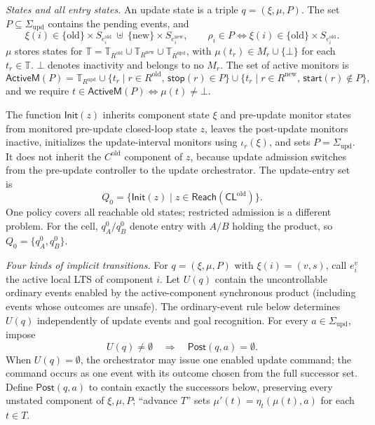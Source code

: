 \documentclass[acmsmall,screen,review,anonymous]{acmart}
\newcommand{\Post}{\mathsf{Post}}
\newcommand{\ActT}{\mathsf{ActiveM}}
\newcommand{\Init}{\mathsf{Init}}
\newcommand{\Reach}{\mathsf{Reach}}
\newcommand{\SigmaU}{\Sigma_{\mathrm{upd}}}
\newcommand{\ustart}[1]{\mathsf{start}(#1)}
\newcommand{\ustop}[1]{\mathsf{stop}(#1)}
\begin{document}
\begin{definition}
\label{def:configuration}
\label{def:init}
\emph{States and all entry states.}
An update state is a triple $q=(\xi,\mu,P)$.
The set $P\subseteq\SigmaU$ contains the pending events, and
\[
 \xi(i)\in
 \{\mathrm{old}\}\times S_{e_i^{\mathrm{old}}}
 \ \uplus\
 \{\mathrm{new}\}\times S_{e_i^{\mathrm{new}}},
 \qquad
 \rho_i\in P\Longleftrightarrow
 \xi(i)\in\{\mathrm{old}\}\times S_{e_i^{\mathrm{old}}}.
\tag{2}\label{eq:version-invariant}
\]
$\mu$ stores states for $\mathbb T=\mathbb T_{R^{\mathrm{old}}}\cup
\mathbb T_{R^{\mathrm{new}}}\cup\mathbb T_{R^{\mathrm{upd}}}$, with
$\mu(t_r)\in M_r\cup\{\bot\}$ for each $t_r\in\mathbb T$. $\bot$ denotes inactivity and belongs to no $M_r$.
The set of active monitors is
\[
\ActT(P)=
\mathbb T_{R^{\mathrm{upd}}}
\cup\{t_r\mid r\in R^{\mathrm{old}},\,\ustop{r}\in P\}
\cup\{t_r\mid r\in R^{\mathrm{new}},\,\ustart{r}\notin P\},
\tag{3}
\]
and we require $t\in\ActT(P)\Longleftrightarrow\mu(t)\neq\bot$.

The function $\Init(z)$ inherits component state $\xi$ and pre-update monitor states from monitored pre-update closed-loop state $z$, leaves the post-update monitors inactive,
initializes the update-interval monitors using $\iota_r(\xi)$,
and sets $P=\SigmaU$. It does not inherit the $C^{\mathrm{old}}$ component of $z$, because update admission switches from the pre-update controller to the update orchestrator. The update-entry set is
\[
 Q_0=\{\Init(z)\mid
 z\in\Reach(\mathsf{CL}^{\mathrm{old}})\}.
\tag{4}\label{eq:initial}
\]
One policy covers all reachable old states; restricted admission is a different problem. For the cell, $q_A^0/q_B^0$ denote entry with $A/B$ holding the product, so $Q_0=\{q_A^0,q_B^0\}$.
\par\noindent\emph{Four kinds of implicit transitions.}
\label{def:successor}
For $q=(\xi,\mu,P)$ with $\xi(i)=(v,s)$, call $e_i^v$ the active local LTS of component $i$. Let $U(q)$ contain the uncontrollable ordinary events enabled by the active-component synchronous product (including events whose outcomes are unsafe). The ordinary-event rule below determines $U(q)$ independently of update events and goal recognition. For every $a\in\SigmaU$, impose
\[
 U(q)\ne\emptyset\quad\Longrightarrow\quad\Post(q,a)=\emptyset.
 \tag{NP}\label{eq:nonpreemption}
\]
When $U(q)=\emptyset$, the orchestrator may issue one enabled update command; the command occurs as one event with its outcome chosen from the full successor set. Define $\Post(q,a)$ to contain exactly the successors below, preserving every unstated component of $\xi,\mu,P$; ``advance $T$'' sets $\mu'(t)=\eta_t(\mu(t),a)$ for each $t\in T$.


\end{definition}
\end{document}
